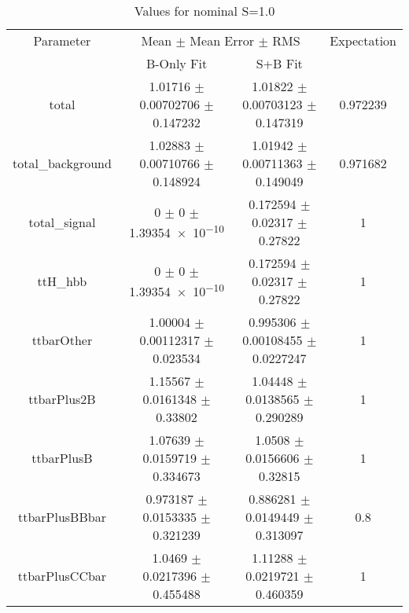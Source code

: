 \begin{table}
\centering
\caption{Values for nominal S=1.0}
\begin{tabular}{cccc}
\toprule
Parameter & \multicolumn{2}{c}{Mean $\pm$ Mean Error $\pm$ RMS} & Expectation\\
 & B-Only Fit & S+B Fit & \\
\midrule
total & \num{1.01716} $\pm$ \num{0.00702706} $\pm$ \num{0.147232} & \num{1.01822} $\pm$ \num{0.00703123} $\pm$ \num{0.147319} & \num{0.972239}\\
total\_background & \num{1.02883} $\pm$ \num{0.00710766} $\pm$ \num{0.148924} & \num{1.01942} $\pm$ \num{0.00711363} $\pm$ \num{0.149049} & \num{0.971682}\\
total\_signal & \num{0} $\pm$ \num{0} $\pm$ \num{1.39354e-10} & \num{0.172594} $\pm$ \num{0.02317} $\pm$ \num{0.27822} & \num{1}\\
ttH\_hbb & \num{0} $\pm$ \num{0} $\pm$ \num{1.39354e-10} & \num{0.172594} $\pm$ \num{0.02317} $\pm$ \num{0.27822} & \num{1}\\
ttbarOther & \num{1.00004} $\pm$ \num{0.00112317} $\pm$ \num{0.023534} & \num{0.995306} $\pm$ \num{0.00108455} $\pm$ \num{0.0227247} & \num{1}\\
ttbarPlus2B & \num{1.15567} $\pm$ \num{0.0161348} $\pm$ \num{0.33802} & \num{1.04448} $\pm$ \num{0.0138565} $\pm$ \num{0.290289} & \num{1}\\
ttbarPlusB & \num{1.07639} $\pm$ \num{0.0159719} $\pm$ \num{0.334673} & \num{1.0508} $\pm$ \num{0.0156606} $\pm$ \num{0.32815} & \num{1}\\
ttbarPlusBBbar & \num{0.973187} $\pm$ \num{0.0153335} $\pm$ \num{0.321239} & \num{0.886281} $\pm$ \num{0.0149449} $\pm$ \num{0.313097} & \num{0.8}\\
ttbarPlusCCbar & \num{1.0469} $\pm$ \num{0.0217396} $\pm$ \num{0.455488} & \num{1.11288} $\pm$ \num{0.0219721} $\pm$ \num{0.460359} & \num{1}\\
\bottomrule
\end{tabular}
\end{table}